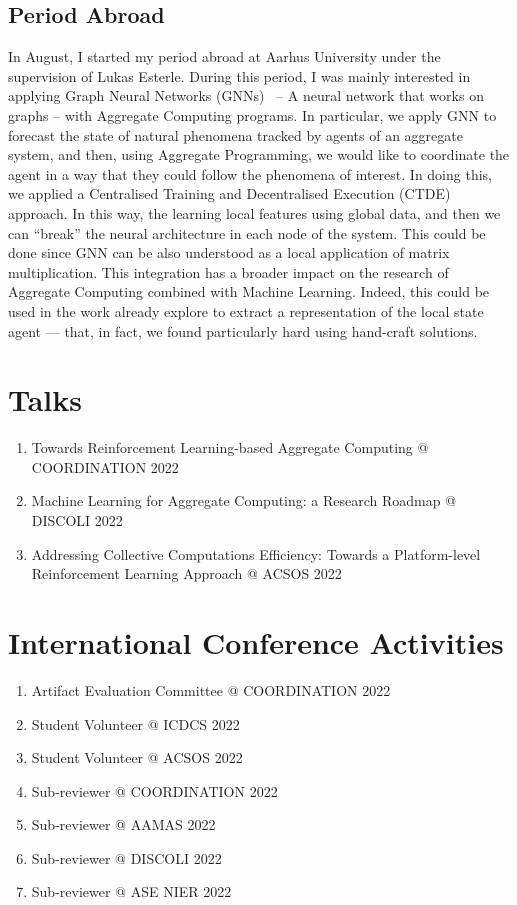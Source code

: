\documentclass[11pt]{article}
\begin{document}
\subsection{Period Abroad}
In August, I started my period abroad 
 at Aarhus University under the supervision of Lukas Esterle.
%
During this period, I was mainly interested in applying Graph Neural Networks (GNNs)~\cite{scarselli2008graph}
 -- A neural network that works on graphs -- 
 with Aggregate Computing programs.
%
In particular, we apply GNN to forecast 
 the state of natural phenomena tracked by agents of an aggregate system, and then, 
 using Aggregate Programming, we would like to coordinate the agent in a way 
 that they could follow the phenomena of interest.
%
In doing this, we applied a Centralised Training and Decentralised Execution (CTDE)~\cite{foerster2018deep} approach. 
%
In this way, the learning local features using global data, 
 and then we can ``break'' the neural architecture in each node of the system.
%
This could be done since GNN can be also understood as a local application of matrix multiplication.
%
This integration has a broader impact on the research of Aggregate Computing combined with Machine Learning. 
%
Indeed, this could be used in the work already 
 explore to extract a representation of the local state agent 
 --- that, in fact, we found particularly hard using hand-craft solutions. 

\section{Talks}
\begin{enumerate}
	\item Towards Reinforcement Learning-based Aggregate Computing @ COORDINATION 2022
	\item Machine Learning for Aggregate Computing: a Research Roadmap @ DISCOLI 2022
	\item Addressing Collective Computations Efficiency: Towards a Platform-level Reinforcement Learning Approach @ ACSOS 2022
\end{enumerate}
\section{International Conference Activities}
\begin{enumerate}
	\item Artifact Evaluation Committee @ COORDINATION 2022
	\item Student Volunteer @ ICDCS 2022
	\item Student Volunteer @ ACSOS 2022
	\item Sub-reviewer @ COORDINATION 2022
	\item Sub-reviewer @ AAMAS 2022
	\item Sub-reviewer @ DISCOLI 2022
	\item Sub-reviewer @ ASE NIER 2022
\end{enumerate}
\end{document}
